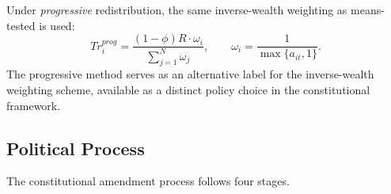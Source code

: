 \documentclass[12pt]{article}
\begin{document}
Under \emph{progressive} redistribution, the same inverse-wealth weighting as means-tested is used:
\begin{equation}\label{eq:progressive_transfer}
  Tr_i^{prog} = \frac{(1 - \phi) R \cdot \omega_i}{\sum_{j=1}^{N} \omega_j}, \qquad \omega_i = \frac{1}{\max\{a_{it}, 1\}}.
\end{equation}
The progressive method serves as an alternative label for the inverse-wealth weighting scheme, available as a distinct policy choice in the constitutional framework.


\subsection{Political Process}\label{sec:political}

The constitutional amendment process follows four stages.
\end{document}
